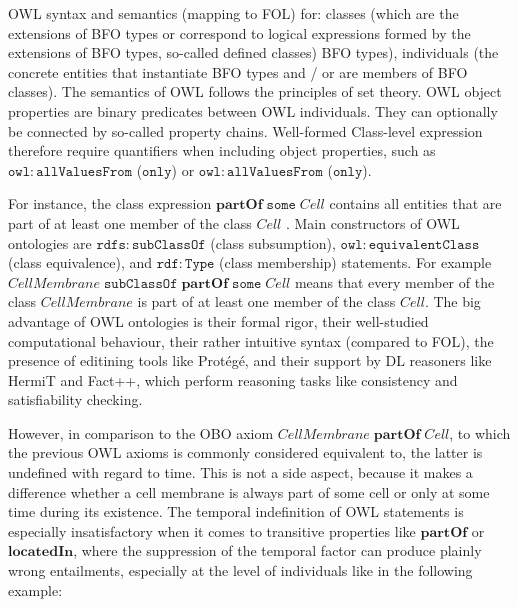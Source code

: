 \documentclass[10pt]{bmc_article}
\newcommand{\mirel}[1]{\ensuremath{\mathrm{\mathbf{#1}}}}
\newcommand{\mclass}[1]{\ensuremath{\mathit{#1}}}
\newenvironment{bmcformat}{\baselineskip20pt\sloppy\setboolean{publ}{false}}{\baselineskip20pt\sloppy}
\begin{document}
\begin{bmcformat}
OWL syntax and semantics (mapping to FOL) for: classes (which 
are the extensions of BFO types or correspond to logical expressions formed by the extensions of BFO types, so-called defined classes)
BFO types), individuals (the concrete entities that instantiate BFO types and / or are members of BFO classes). 
The semantics of OWL follows the principles of set theory. 
OWL object properties are binary predicates between OWL individuals. They can optionally be connected by so-called property chains. 
Well-formed Class-level expression therefore 
require quantifiers when including object properties, such as $\mathtt{owl:allValuesFrom}$ ($\mathtt{only}$) or $\mathtt{owl:allValuesFrom}$ ($\mathtt{only}$).



For instance, the class expression $\mirel{partOf}\;\mathtt{some}\;\mclass{Cell}$ contains all entities that are part of at least one member of the class $\mclass{Cell}$ . 
Main constructors of OWL ontologies are $\mathtt{rdfs:subClassOf}$ (class subsumption), $\mathtt{owl:equivalentClass}$ (class equivalence), 
and $\mathtt{rdf:Type}$  (class membership) statements. 
For example $\mclass{CellMembrane}\;\mathtt{subClassOf}\;\mirel{partOf}\;\mathtt{some}\;\mclass{Cell}$ means that every member of the class $\mclass{CellMembrane}$ is 
part of at least one member of the class $\mclass{Cell}$. 
The big advantage of OWL ontologies is their formal rigor, their well-studied computational behaviour, their rather intuitive syntax (compared to FOL), the presence of editining tools like Protégé, and their support by DL reasoners like HermiT and Fact++, which perform reasoning tasks like consistency and satisfiability checking. 



However, in comparison to the OBO axiom 
$\mclass{CellMembrane}\;\mirel{partOf}\;\mclass{Cell}$, to which the previous OWL axioms is commonly considered equivalent to, the latter is undefined with regard to time. This is not a side aspect, because it makes a difference whether a cell membrane is always part of some cell or only at some time during its existence. The temporal indefinition of OWL statements is especially insatisfactory when it comes to transitive properties like $\mirel{partOf}$ or $\mirel{locatedIn}$, where the suppression of the temporal factor can produce plainly wrong entailments, especially at the level of individuals like in the following example: 


\end{bmcformat}
\end{document}
